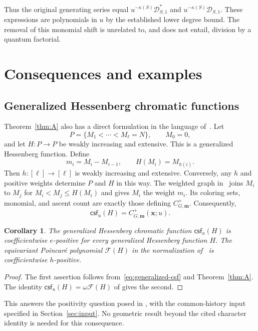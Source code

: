 \documentclass[11pt,reqno]{amsart}
\newcommand{\xx}{\mathbf x}
\newcommand{\mm}{\mathbf m}
\newcommand{\DD}{\mathcal D}
\newcommand{\csf}{\mathsf{csf}}
\newtheorem{corollary}[theorem]{Corollary}
\theoremstyle{definition}
\theoremstyle{remark}
\numberwithin{equation}{section}
\begin{document}
Thus the original generating series equal $u^{-\kappa(S)}\DD^*_{S,1}$
and $u^{-\kappa(S)}\DD_{S,1}$.  These expressions are polynomials in
$u$ by the established lower degree bound.  The removal of this
monomial shift is unrelated to, and does not entail, division by a
quantum factorial.

\section{Consequences and examples}\label{sec:examples}

\subsection{Generalized Hessenberg chromatic functions}
Theorem~\ref{thm:A} also has a direct formulation in the language
of~\cite{KiemLee2024}.  Let
\[
 P=\{M_1<\cdots<M_\ell=N\},\qquad M_0=0,
\]
and let $H:P\to P$ be weakly increasing and extensive.  This is a
generalized Hessenberg function.  Define
\begin{equation}\label{eq:generalized-dictionary}
 m_i=M_i-M_{i-1},\qquad H(M_i)=M_{h(i)}.
\end{equation}
Then $h:[\ell]\to[\ell]$ is weakly increasing and extensive.  Conversely,
any $h$ and positive weights determine $P$ and $H$ in this way.
The weighted graph in~\cite[Definitions~4.1--4.3]{KiemLee2024} joins
$M_i$ to $M_j$ for $M_i<M_j\leq H(M_i)$ and gives $M_i$ the weight
$m_i$.  Its coloring sets, monomial, and ascent count are exactly
those defining $C^+_{G,\mm}$.  Consequently,
\begin{equation}\label{eq:generalized-csf}
 \csf_u(H)=C^+_{G,\mm}(\xx;u).
\end{equation}

\begin{corollary}\label{cor:generalized}
The generalized Hessenberg chromatic function $\csf_u(H)$ is
coefficientwise $e$-positive for every generalized Hessenberg function
$H$.  The equivariant Poincar\'e polynomial $\mathcal F(H)$ in the
normalization of~\cite{KiemLee2024} is coefficientwise $h$-positive.
\end{corollary}
\begin{proof}
The first assertion follows from~\eqref{eq:generalized-csf} and
Theorem~\ref{thm:A}.  The identity
$\csf_u(H)=\omega\mathcal F(H)$ of
\cite[Theorem~4.6]{KiemLee2024} gives the second.
\end{proof}

This answers the positivity question posed in
\cite[Question~4.9]{KiemLee2024}, with the common-history input specified
in Section~\ref{sec:input}.  No geometric result beyond the cited
character identity is needed for this consequence.
\end{document}
